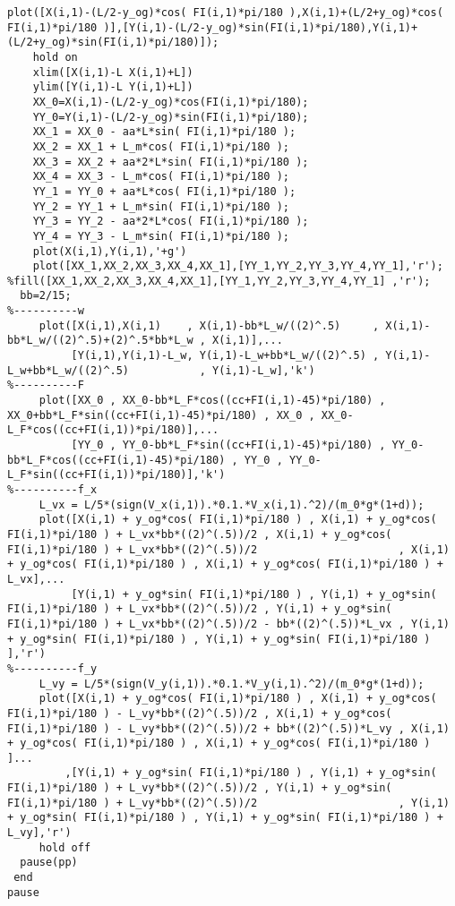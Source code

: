 \documentclass[UTF8]{article}
\begin{document}
\begin{appendix}
\begin{lstlisting}[title=main.m, frame=shadowbox]
    plot([X(i,1)-(L/2-y_og)*cos( FI(i,1)*pi/180 ),X(i,1)+(L/2+y_og)*cos( FI(i,1)*pi/180 )],[Y(i,1)-(L/2-y_og)*sin(FI(i,1)*pi/180),Y(i,1)+(L/2+y_og)*sin(FI(i,1)*pi/180)]);
    hold on
    xlim([X(i,1)-L X(i,1)+L])
    ylim([Y(i,1)-L Y(i,1)+L])
    XX_0=X(i,1)-(L/2-y_og)*cos(FI(i,1)*pi/180);
    YY_0=Y(i,1)-(L/2-y_og)*sin(FI(i,1)*pi/180);
    XX_1 = XX_0 - aa*L*sin( FI(i,1)*pi/180 );
    XX_2 = XX_1 + L_m*cos( FI(i,1)*pi/180 );
    XX_3 = XX_2 + aa*2*L*sin( FI(i,1)*pi/180 );
    XX_4 = XX_3 - L_m*cos( FI(i,1)*pi/180 );
    YY_1 = YY_0 + aa*L*cos( FI(i,1)*pi/180 );
    YY_2 = YY_1 + L_m*sin( FI(i,1)*pi/180 );
    YY_3 = YY_2 - aa*2*L*cos( FI(i,1)*pi/180 );
    YY_4 = YY_3 - L_m*sin( FI(i,1)*pi/180 );
    plot(X(i,1),Y(i,1),'+g')
    plot([XX_1,XX_2,XX_3,XX_4,XX_1],[YY_1,YY_2,YY_3,YY_4,YY_1],'r');
%fill([XX_1,XX_2,XX_3,XX_4,XX_1],[YY_1,YY_2,YY_3,YY_4,YY_1] ,'r');
  bb=2/15;
%----------w
     plot([X(i,1),X(i,1)    , X(i,1)-bb*L_w/((2)^.5)     , X(i,1)-bb*L_w/((2)^.5)+(2)^.5*bb*L_w , X(i,1)],...
          [Y(i,1),Y(i,1)-L_w, Y(i,1)-L_w+bb*L_w/((2)^.5) , Y(i,1)-L_w+bb*L_w/((2)^.5)           , Y(i,1)-L_w],'k')
%----------F
     plot([XX_0 , XX_0-bb*L_F*cos((cc+FI(i,1)-45)*pi/180) , XX_0+bb*L_F*sin((cc+FI(i,1)-45)*pi/180) , XX_0 , XX_0-L_F*cos((cc+FI(i,1))*pi/180)],...
          [YY_0 , YY_0-bb*L_F*sin((cc+FI(i,1)-45)*pi/180) , YY_0-bb*L_F*cos((cc+FI(i,1)-45)*pi/180) , YY_0 , YY_0-L_F*sin((cc+FI(i,1))*pi/180)],'k')
%----------f_x
     L_vx = L/5*(sign(V_x(i,1)).*0.1.*V_x(i,1).^2)/(m_0*g*(1+d));
     plot([X(i,1) + y_og*cos( FI(i,1)*pi/180 ) , X(i,1) + y_og*cos( FI(i,1)*pi/180 ) + L_vx*bb*((2)^(.5))/2 , X(i,1) + y_og*cos( FI(i,1)*pi/180 ) + L_vx*bb*((2)^(.5))/2                      , X(i,1) + y_og*cos( FI(i,1)*pi/180 ) , X(i,1) + y_og*cos( FI(i,1)*pi/180 ) + L_vx],...
          [Y(i,1) + y_og*sin( FI(i,1)*pi/180 ) , Y(i,1) + y_og*sin( FI(i,1)*pi/180 ) + L_vx*bb*((2)^(.5))/2 , Y(i,1) + y_og*sin( FI(i,1)*pi/180 ) + L_vx*bb*((2)^(.5))/2 - bb*((2)^(.5))*L_vx , Y(i,1) + y_og*sin( FI(i,1)*pi/180 ) , Y(i,1) + y_og*sin( FI(i,1)*pi/180 )       ],'r')
%----------f_y
     L_vy = L/5*(sign(V_y(i,1)).*0.1.*V_y(i,1).^2)/(m_0*g*(1+d));
     plot([X(i,1) + y_og*cos( FI(i,1)*pi/180 ) , X(i,1) + y_og*cos( FI(i,1)*pi/180 ) - L_vy*bb*((2)^(.5))/2 , X(i,1) + y_og*cos( FI(i,1)*pi/180 ) - L_vy*bb*((2)^(.5))/2 + bb*((2)^(.5))*L_vy , X(i,1) + y_og*cos( FI(i,1)*pi/180 ) , X(i,1) + y_og*cos( FI(i,1)*pi/180 )       ]...
         ,[Y(i,1) + y_og*sin( FI(i,1)*pi/180 ) , Y(i,1) + y_og*sin( FI(i,1)*pi/180 ) + L_vy*bb*((2)^(.5))/2 , Y(i,1) + y_og*sin( FI(i,1)*pi/180 ) + L_vy*bb*((2)^(.5))/2                      , Y(i,1) + y_og*sin( FI(i,1)*pi/180 ) , Y(i,1) + y_og*sin( FI(i,1)*pi/180 ) + L_vy],'r')
     hold off
  pause(pp)
 end
pause


\end{lstlisting}
\end{appendix}
\end{document}
